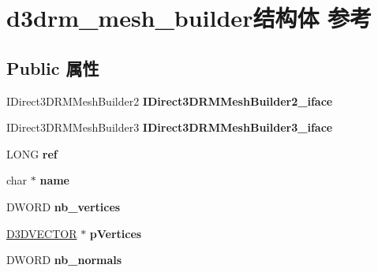 \hypertarget{structd3drm__mesh__builder}{}\section{d3drm\+\_\+mesh\+\_\+builder结构体 参考}
\label{structd3drm__mesh__builder}
\subsection*{Public 属性}
\begin{DoxyCompactItemize}
\item 
\mbox{\label{structd3drm__mesh__builder_acc9590b46e39b93a6846a6c178255a87}} 
I\+Direct3\+D\+R\+M\+Mesh\+Builder2 {\bfseries I\+Direct3\+D\+R\+M\+Mesh\+Builder2\+\_\+iface}
\item 
\mbox{\label{structd3drm__mesh__builder_a5a9d23e75b780a804c65631f83b4dab5}} 
I\+Direct3\+D\+R\+M\+Mesh\+Builder3 {\bfseries I\+Direct3\+D\+R\+M\+Mesh\+Builder3\+\_\+iface}
\item 
\mbox{\label{structd3drm__mesh__builder_a27a3d42bb21ccc9719d48d45906bce75}} 
L\+O\+NG {\bfseries ref}
\item 
\mbox{\label{structd3drm__mesh__builder_ac9697a6e13a18e1226fdf59dfa4998db}} 
char $\ast$ {\bfseries name}
\item 
\mbox{\label{structd3drm__mesh__builder_a87067a64cf04974dbc7d5c658734d12e}} 
D\+W\+O\+RD {\bfseries nb\+\_\+vertices}
\item 
\mbox{\label{structd3drm__mesh__builder_a06e4362da9f63456646b1e3ea0d1e7de}} 
\hyperlink{struct___d3_d_v_e_c_t_o_r}{D3\+D\+V\+E\+C\+T\+OR} $\ast$ {\bfseries p\+Vertices}
\item 
\mbox{\label{structd3drm__mesh__builder_abbe8673fb67ba6c773a0d86d91ad1685}} 
D\+W\+O\+RD {\bfseries nb\+\_\+normals}
\item 
\mbox{\label{structd3drm__mesh__builder_ae48e5c789ed643824d86760647516b72}} 

\end{DoxyCompactItemize}

